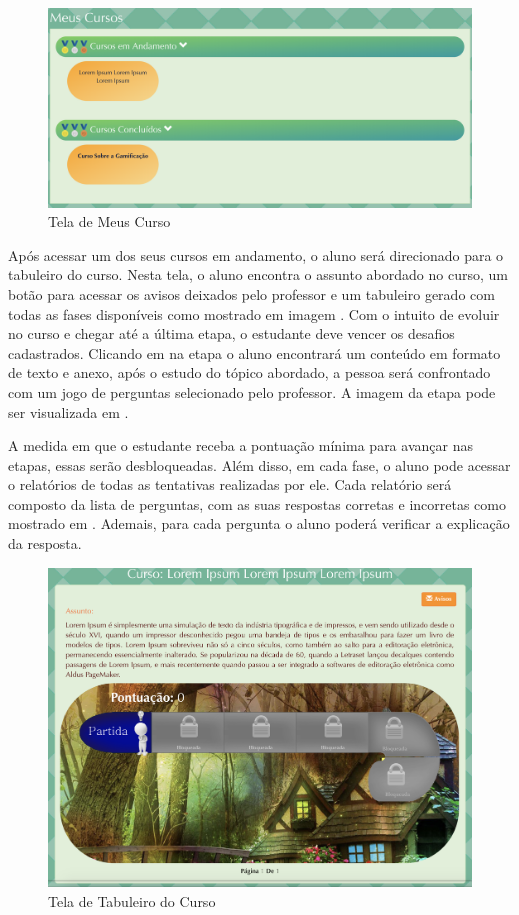 \begin{figure}[H]
  \centering
  \includegraphics[scale=0.40]{images/proposta-img/Figura4-38.png}
  \caption{Tela de Meus Curso}
  \label{fig:Figura4-38}
\end{figure}
Após acessar um dos seus cursos em andamento, o aluno será direcionado para o tabuleiro do curso. Nesta tela, o aluno encontra o assunto abordado no curso, um botão para acessar os avisos deixados pelo professor e um tabuleiro gerado com todas as fases disponíveis como mostrado em  imagem . Com o intuito de evoluir no curso e chegar até a última etapa, o estudante deve vencer os desafios cadastrados. Clicando em na etapa o aluno encontrará um conteúdo em formato de texto e anexo, após o estudo do tópico abordado, a pessoa será confrontado com um jogo de perguntas selecionado pelo professor. A imagem da etapa pode ser visualizada em .

A medida em que o estudante receba a pontuação mínima para avançar nas etapas, essas serão desbloqueadas. Além disso, em cada fase, o aluno pode acessar o relatórios de todas as tentativas realizadas por ele. Cada relatório será composto da lista de perguntas, com as suas respostas corretas e incorretas como mostrado em . Ademais, para cada pergunta o aluno poderá verificar a explicação da resposta.

\begin{figure}[H]
  \centering
  \includegraphics[scale=0.44]{images/proposta-img/Figura4-39.png}
  \caption{Tela de Tabuleiro do Curso}
  \label{fig:Figura4-39}
\end{figure}

